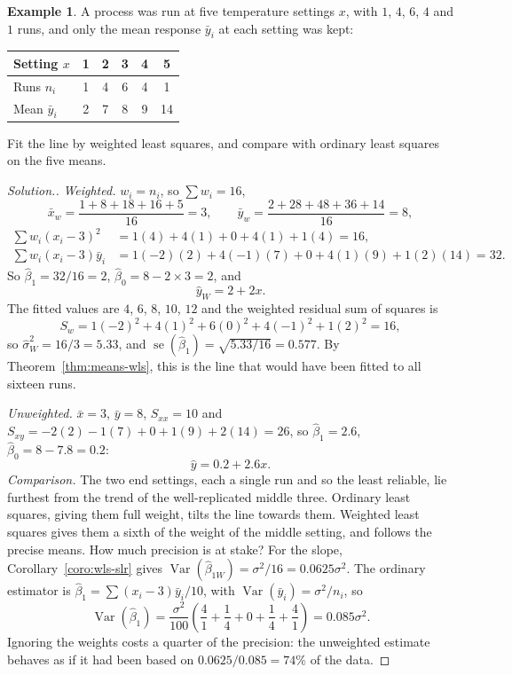 \documentclass[11pt,a4paper]{article}
\numberwithin{equation}{section}
\theoremstyle{definition}
\newtheorem{exa}[thm]{Example}
\newenvironment{solution}
  {\renewcommand{\qedsymbol}{}\begin{proof}[\textit{Solution}.]}
  {\end{proof}}
\begin{document}
\begin{exa}\label{exa:wls-means}
A process was run at five temperature settings $x$, with $1$, $4$, $6$, $4$ and $1$ runs, and
only the mean response $\bar y_i$ at each setting was kept:
\begin{center}
\begin{tabular}{l|ccccc}
Setting $x$ & 1 & 2 & 3 & 4 & 5 \\
\hline
Runs $n_i$ & 1 & 4 & 6 & 4 & 1 \\
Mean $\bar y_i$ & 2 & 7 & 8 & 9 & 14 \\
\end{tabular}
\end{center}
Fit the line by weighted least squares, and compare with ordinary least squares on the five means.
\end{exa}

\begin{solution}
\emph{Weighted.} $w_i = n_i$, so $\sum w_i = 16$,
\[
\bar x_w = \frac{1 + 8 + 18 + 16 + 5}{16} = 3, \qquad
\bar y_w = \frac{2 + 28 + 48 + 36 + 14}{16} = 8 ,
\]
\begin{align*}
\textstyle\sum w_i(x_i - 3)^2 &= 1(4) + 4(1) + 0 + 4(1) + 1(4) = 16, \\
\textstyle\sum w_i(x_i - 3)\bar y_i &= 1(-2)(2) + 4(-1)(7) + 0 + 4(1)(9) + 1(2)(14) = 32 .
\end{align*}
So $\hat\beta_1 = 32/16 = 2$, $\hat\beta_0 = 8 - 2 \times 3 = 2$, and
\[
\hat y_W = 2 + 2x .
\]
The fitted values are $4$, $6$, $8$, $10$, $12$ and the weighted residual sum of squares is
\[
S_w = 1(-2)^2 + 4(1)^2 + 6(0)^2 + 4(-1)^2 + 1(2)^2 = 16 ,
\]
so $\hat\sigma^2_W = 16/3 = 5.33$, and $\operatorname{se}(\hat\beta_1) = \sqrt{5.33/16} = 0.577$. By
Theorem~\ref{thm:means-wls}, this is the line that would have been fitted to all sixteen runs.

\emph{Unweighted.} $\bar x = 3$, $\bar y = 8$, $S_{xx} = 10$ and
$S_{xy} = -2(2) - 1(7) + 0 + 1(9) + 2(14) = 26$, so $\hat\beta_1 = 2.6$, $\hat\beta_0 = 8 - 7.8 = 0.2$:
\[
\hat y = 0.2 + 2.6x .
\]
\emph{Comparison.} The two end settings, each a single run and so the least reliable, lie
furthest from the trend of the well-replicated middle three. Ordinary least squares, giving them
full weight, tilts the line towards them. Weighted least squares gives them a sixth of the
weight of the middle setting, and follows the precise means. How much precision is at stake? For
the slope, Corollary~\ref{coro:wls-slr} gives $\operatorname{Var}(\hat\beta_{1W}) = \sigma^2/16 = 0.0625\sigma^2$.
The ordinary estimator is $\hat\beta_1 = \sum(x_i - 3)\bar y_i/10$, with
$\operatorname{Var}(\bar y_i) = \sigma^2/n_i$, so
\[
\operatorname{Var}(\hat\beta_1) = \frac{\sigma^2}{100}\left(\frac{4}{1} + \frac{1}{4} + 0 + \frac{1}{4} + \frac{4}{1}\right) = 0.085\sigma^2 .
\]
Ignoring the weights costs a quarter of the precision: the unweighted estimate behaves as if it
had been based on $0.0625/0.085 = 74\%$ of the data.
\end{solution}
\end{document}
